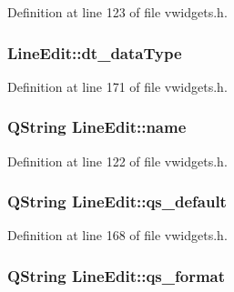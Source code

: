 Definition at line 123 of file vwidgets.h.

\hypertarget{classLineEdit_a7eafffbf2d586eac9c90f5d97fd89c6e}{
\subsubsection[{dt\_\-dataType}]{ {\bf LineEdit::dt\_\-dataType}}}
\label{classLineEdit_a7eafffbf2d586eac9c90f5d97fd89c6e}


Definition at line 171 of file vwidgets.h.

\hypertarget{classLineEdit_a337f64c9e882f065b5771f9e2289784f}{
\subsubsection[{name}]{\setlength{\rightskip}{0pt plus 5cm}QString {\bf LineEdit::name}}}
\label{classLineEdit_a337f64c9e882f065b5771f9e2289784f}


Definition at line 122 of file vwidgets.h.

\hypertarget{classLineEdit_a73d2e143f00df406134a9e73ceba40af}{
\subsubsection[{qs\_\-default}]{\setlength{\rightskip}{0pt plus 5cm}QString {\bf LineEdit::qs\_\-default}}}
\label{classLineEdit_a73d2e143f00df406134a9e73ceba40af}


Definition at line 168 of file vwidgets.h.

\hypertarget{classLineEdit_ac06a746e3b29d84d14672e0931d1c457}{
\subsubsection[{qs\_\-format}]{\setlength{\rightskip}{0pt plus 5cm}QString {\bf LineEdit::qs\_\-format}}}
\label{classLineEdit_ac06a746e3b29d84d14672e0931d1c457}


